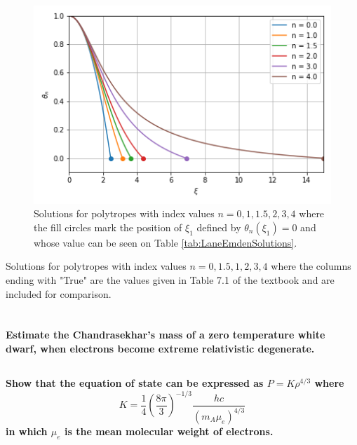 \begin{figure}
    \centering
    \includegraphics{CodeAndFigures/Astro643Hw3P2Plot.png}
    \caption{Solutions for polytropes with index values $n=0,1,1.5,2,3,4$ where the fill circles mark the position of $\xi_1$ defined by $\theta_n(\xi_1)=0$ and whose value can be seen on Table \ref{tab:LaneEmdenSolutions}.}
    \label{fig:LaneEmdenSolutions}
\end{figure}

\begin{table}[ht]
    \centering
    
    \caption{Solutions for polytropes with index values $n=0,1.5,1,2,3,4$ where the columns ending with "True" are the values given in Table 7.1 of the textbook and are included for comparison.}
    \label{tab:LaneEmdenSolutions}
\end{table}


\section{}
\textbf{Estimate the Chandrasekhar's mass of a zero temperature white dwarf, when electrons become extreme relativistic degenerate.}
\subsection{}
\textbf{Show that the equation of state can be expressed as $P=K\rho^{4/3}$ where
\begin{equation}
    K = \frac{1}{4}\left(\frac{8\pi}{3}\right)^{-1/3}\frac{hc}{(m_A\mu_e)^{4/3}}
\end{equation}
in which $\mu_e$ is the mean molecular weight of electrons.}

